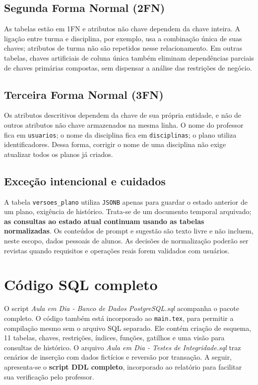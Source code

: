 \documentclass[12pt,a4paper,oneside]{report}
\begin{document}
\subsection{Segunda Forma Normal (2FN)}
As tabelas estão em 1FN e atributos não chave dependem da chave inteira. A ligação entre turma e disciplina, por exemplo, usa a combinação única de suas chaves; atributos de turma não são repetidos nesse relacionamento. Em outras tabelas, chaves artificiais de coluna única também eliminam dependências parciais de chaves primárias compostas, sem dispensar a análise das restrições de negócio.

\subsection{Terceira Forma Normal (3FN)}
Os atributos descritivos dependem da chave de sua própria entidade, e não de outros atributos não chave armazenados na mesma linha. O nome do professor fica em \texttt{usuarios}; o nome da disciplina fica em \texttt{disciplinas}; o plano utiliza identificadores. Dessa forma, corrigir o nome de uma disciplina não exige atualizar todos os planos já criados.

\subsection{Exceção intencional e cuidados}
A tabela \texttt{versoes\_plano} utiliza \texttt{JSONB} apenas para guardar o estado anterior de um plano, exigência de histórico. Trata-se de um documento temporal arquivado; \textbf{as consultas ao estado atual continuam usando as tabelas normalizadas}. Os conteúdos de prompt e sugestão são texto livre e não incluem, neste escopo, dados pessoais de alunos. As decisões de normalização poderão ser revistas quando requisitos e operações reais forem validados com usuários.

\section{Código SQL completo}
O script \textit{Aula em Dia - Banco de Dados PostgreSQL.sql} acompanha o pacote completo. O código também está incorporado ao \texttt{main.tex}, para permitir a compilação mesmo sem o arquivo SQL separado. Ele contém criação de esquema, 11 tabelas, chaves, restrições, índices, funções, gatilhos e uma visão para consultas de histórico. O arquivo \textit{Aula em Dia - Testes de Integridade.sql} traz cenários de inserção com dados fictícios e reversão por transação. A seguir, apresenta-se o \textbf{script DDL completo}, incorporado ao relatório para facilitar sua verificação pelo professor.
\end{document}
